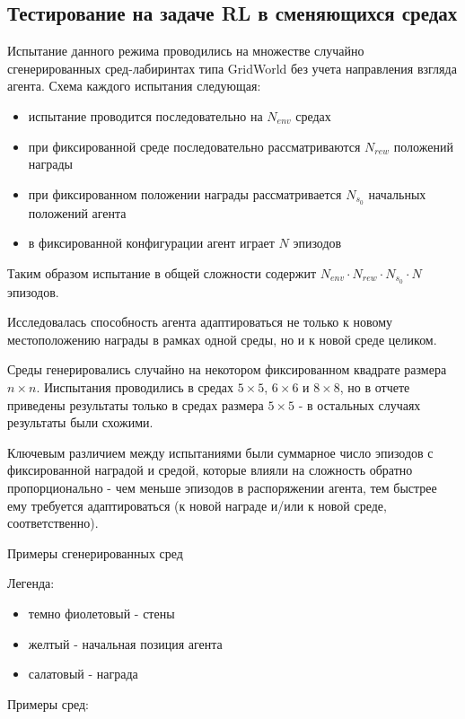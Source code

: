 \documentclass[a4paper]{article}
\begin{document}
\subsection{Тестирование на задаче RL в сменяющихся средах}

Испытание данного режима проводились на множестве случайно сгенерированных сред-лабиринтах типа GridWorld без учета направления взгляда агента. Схема каждого испытания следующая:

\begin{itemize}
  \item испытание проводится последовательно на $N_{env}$ средах
  \item при фиксированной среде последовательно рассматриваются $N_{rew}$ положений награды
  \item при фиксированном положении награды рассматривается $N_{s_0}$ начальных положений агента
  \item в фиксированной конфигурации агент играет $N$ эпизодов
\end{itemize}

Таким образом испытание в общей сложности содержит $N_{env} \cdot N_{rew} \cdot N_{s_0} \cdot N$ эпизодов.

Исследовалась способность агента адаптироваться не только к новому местоположению награды в рамках одной среды, но и к новой среде целиком.

Среды генерировались случайно на некотором фиксированном квадрате размера $n \times n$. Ииспытания проводились в средах $5 \times 5$, $6 \times 6$ и $8 \times 8$, но в отчете приведены результаты только в средах размера $5 \times 5$ - в остальных случаях результаты были схожими.

Ключевым различием между испытаниями были суммарное число эпизодов с фиксированной наградой и средой, которые влияли на сложность обратно пропорционально - чем меньше эпизодов в распоряжении агента, тем быстрее ему требуется адаптироваться (к новой награде и/или к новой среде, соответственно).

Примеры сгенерированных сред

Легенда:

\begin{itemize}
  \item темно фиолетовый - стены
  \item желтый - начальная позиция агента
  \item салатовый - награда
\end{itemize}

Примеры сред:
\end{document}
